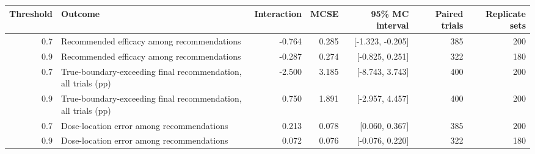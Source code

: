 \begin{tabular}{rlrrrrr}
\toprule
Threshold & Outcome & Interaction & MCSE & 95\% MC interval & Paired trials & Replicate sets \\
\midrule
0.7 & Recommended efficacy among recommendations & -0.764 & 0.285 & [-1.323, -0.205] & 385 & 200 \\
0.9 & Recommended efficacy among recommendations & -0.287 & 0.274 & [-0.825, 0.251] & 322 & 180 \\
0.7 & True-boundary-exceeding final recommendation, all trials (pp) & -2.500 & 3.185 & [-8.743, 3.743] & 400 & 200 \\
0.9 & True-boundary-exceeding final recommendation, all trials (pp) & 0.750 & 1.891 & [-2.957, 4.457] & 400 & 200 \\
0.7 & Dose-location error among recommendations & 0.213 & 0.078 & [0.060, 0.367] & 385 & 200 \\
0.9 & Dose-location error among recommendations & 0.072 & 0.076 & [-0.076, 0.220] & 322 & 180 \\
\bottomrule
\end{tabular}
